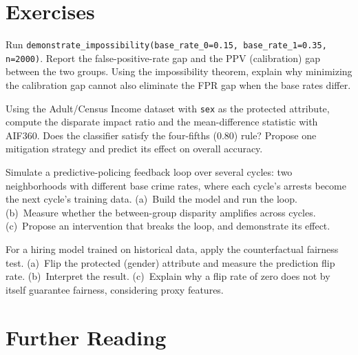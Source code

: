 \section{Exercises}

\begin{Exercise}
Run \texttt{demonstrate\_impossibility(base\_rate\_0=0.15, base\_rate\_1=0.35, n=2000)}. Report the false-positive-rate gap and the PPV (calibration) gap between the two groups. Using the impossibility theorem, explain why minimizing the calibration gap cannot also eliminate the FPR gap when the base rates differ.
\end{Exercise}

\begin{Exercise}
Using the Adult/Census Income dataset with \texttt{sex} as the protected attribute, compute the disparate impact ratio and the mean-difference statistic with AIF360. Does the classifier satisfy the four-fifths (0.80) rule? Propose one mitigation strategy and predict its effect on overall accuracy.
\end{Exercise}

\begin{Exercise}
Simulate a predictive-policing feedback loop over several cycles: two neighborhoods with different base crime rates, where each cycle's arrests become the next cycle's training data. (a)~Build the model and run the loop. (b)~Measure whether the between-group disparity amplifies across cycles. (c)~Propose an intervention that breaks the loop, and demonstrate its effect.
\end{Exercise}

\begin{Exercise}
For a hiring model trained on historical data, apply the counterfactual fairness test. (a)~Flip the protected (gender) attribute and measure the prediction flip rate. (b)~Interpret the result. (c)~Explain why a flip rate of zero does not by itself guarantee fairness, considering proxy features.
\end{Exercise}

\section{Further Reading}
\label{sec:a14-further-reading}

